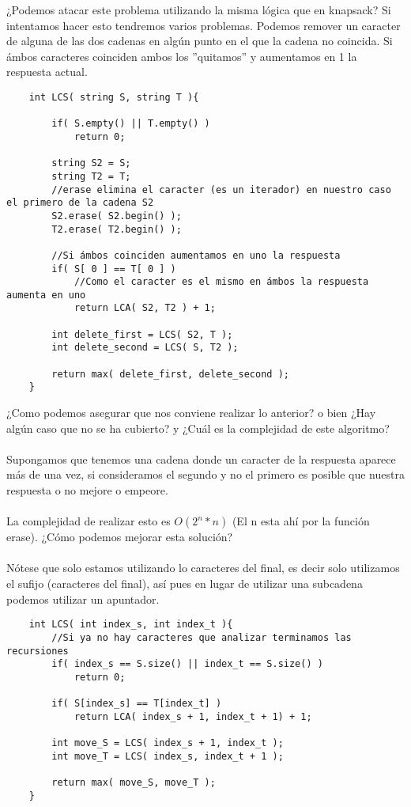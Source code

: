 ¿Podemos atacar este problema utilizando la misma lógica que en knapsack? Si intentamos hacer esto tendremos varios problemas. Podemos remover un caracter de alguna de las dos cadenas en algún punto en el que la cadena no coincida. Si ámbos caracteres coinciden ambos los ''quitamos'' y aumentamos en 1 la respuesta actual.

\begin{lstlisting}
    int LCS( string S, string T ){

        if( S.empty() || T.empty() )
            return 0;

        string S2 = S;
        string T2 = T;
        //erase elimina el caracter (es un iterador) en nuestro caso el primero de la cadena S2
        S2.erase( S2.begin() );
        T2.erase( T2.begin() );

        //Si ámbos coinciden aumentamos en uno la respuesta
        if( S[ 0 ] == T[ 0 ] )
            //Como el caracter es el mismo en ámbos la respuesta aumenta en uno
            return LCA( S2, T2 ) + 1;

        int delete_first = LCS( S2, T );
        int delete_second = LCS( S, T2 );

        return max( delete_first, delete_second );
    }
\end{lstlisting}

¿Como podemos asegurar que nos conviene realizar lo anterior? o bien ¿Hay algún caso que no se ha cubierto? y ¿Cuál es la complejidad de este algoritmo? \\ \\

Supongamos que tenemos una cadena donde un caracter de la respuesta aparece más de una vez, si consideramos el segundo y no el primero es posible que nuestra respuesta o no mejore o empeore. \\\\

La complejidad de realizar esto es $O(2^{n} * n)$ (El n esta ahí por la función erase). ¿Cómo podemos mejorar esta solución?\\\\

Nótese que solo estamos utilizando lo caracteres del final, es decir solo utilizamos el sufijo (caracteres del final), así pues en lugar de utilizar una subcadena podemos utilizar un apuntador.

\begin{lstlisting}
    int LCS( int index_s, int index_t ){
        //Si ya no hay caracteres que analizar terminamos las recursiones
        if( index_s == S.size() || index_t == S.size() )
            return 0;
        
        if( S[index_s] == T[index_t] )
            return LCA( index_s + 1, index_t + 1) + 1;
        
        int move_S = LCS( index_s + 1, index_t );
        int move_T = LCS( index_s, index_t + 1 );

        return max( move_S, move_T );
    }
\end{lstlisting}


